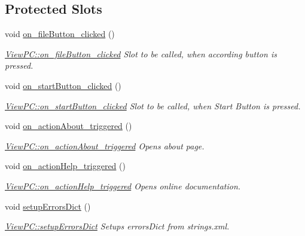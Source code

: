 \subsection*{Protected Slots}
\begin{DoxyCompactItemize}
\item 
void \hyperlink{class_view_p_c_a3b9b7a7be9702d8b160f257f1c74a776}{on\+\_\+file\+Button\+\_\+clicked} ()
\begin{DoxyCompactList}\small\item\em \hyperlink{class_view_p_c_a3b9b7a7be9702d8b160f257f1c74a776}{View\+P\+C\+::on\+\_\+file\+Button\+\_\+clicked} Slot to be called, when according button is pressed. \end{DoxyCompactList}\item 
void \hyperlink{class_view_p_c_a456d75b7c5d3a089302a576e7359f1f4}{on\+\_\+start\+Button\+\_\+clicked} ()
\begin{DoxyCompactList}\small\item\em \hyperlink{class_view_p_c_a456d75b7c5d3a089302a576e7359f1f4}{View\+P\+C\+::on\+\_\+start\+Button\+\_\+clicked} Slot to be called, when Start Button is pressed. \end{DoxyCompactList}\item 
void \hyperlink{class_view_p_c_a09a46da4d492eb3dde88f35dc58c997b}{on\+\_\+action\+About\+\_\+triggered} ()
\begin{DoxyCompactList}\small\item\em \hyperlink{class_view_p_c_a09a46da4d492eb3dde88f35dc58c997b}{View\+P\+C\+::on\+\_\+action\+About\+\_\+triggered} Opens about page. \end{DoxyCompactList}\item 
void \hyperlink{class_view_p_c_a0d252ff4829260c6c76769fbd24b7cd7}{on\+\_\+action\+Help\+\_\+triggered} ()
\begin{DoxyCompactList}\small\item\em \hyperlink{class_view_p_c_a0d252ff4829260c6c76769fbd24b7cd7}{View\+P\+C\+::on\+\_\+action\+Help\+\_\+triggered} Opens online documentation. \end{DoxyCompactList}\item 
void \hyperlink{class_view_p_c_a89236a0bb8760f02e984b85a8571934c}{setup\+Errors\+Dict} ()
\begin{DoxyCompactList}\small\item\em \hyperlink{class_view_p_c_a89236a0bb8760f02e984b85a8571934c}{View\+P\+C\+::setup\+Errors\+Dict} Setups errors\+Dict from strings.\+xml. \end{DoxyCompactList}\end{DoxyCompactItemize}
